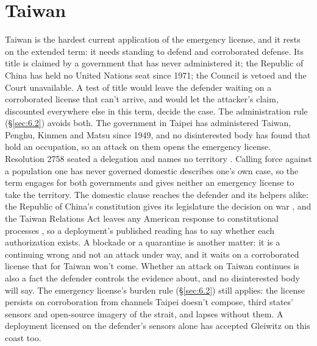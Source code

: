 \section{Taiwan}
\label{sec:F.3}
Taiwan is the hardest current application of the emergency license, and it rests on the extended term: it needs standing to defend and corroborated defense. Its title is claimed by a government that has never administered it; the Republic of China has held no United Nations seat since 1971; the Council is vetoed and the Court unavailable. A test of title would leave the defender waiting on a corroborated license that can't arrive, and would let the attacker's claim, discounted everywhere else in this term, decide the case. The administration rule (\S\ref{sec:6.2}) avoids both. The government in Taipei has administered Taiwan, Penghu, Kinmen and Matsu since 1949, and no disinterested body has found that hold an occupation, so an attack on them opens the emergency license. Resolution 2758 seated a delegation and names no territory \autocite{unga1971res2758}. Calling force against a population one has never governed domestic describes one's own case, so the term engages for both governments and gives neither an emergency license to take the territory. The domestic clause reaches the defender and its helpers alike: the Republic of China's constitution gives its legislature the decision on war \autocite{roc1947constitution}, and the Taiwan Relations Act leaves any American response to constitutional processes \autocite{tra1979}, so a deployment's published reading has to say whether each authorization exists. A blockade or a quarantine is another matter: it is a continuing wrong and not an attack under way, and it waits on a corroborated license that for Taiwan won't come. Whether an attack on Taiwan continues is also a fact the defender controls the evidence about, and no disinterested body will say. The emergency license's burden rule (\S\ref{sec:6.2}) still applies: the license persists on corroboration from channels Taipei doesn't compose, third states' sensors and open-source imagery of the strait, and lapses without them. A deployment licensed on the defender's sensors alone has accepted Gleiwitz on this coast too.
